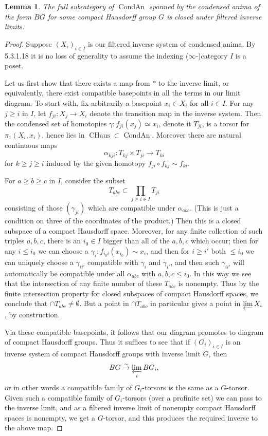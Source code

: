 \documentclass[12pt]{article}
\newtheorem{lemma}[theorem]{Lemma}
\theoremstyle{definition}
\newcommand{\on}{\operatorname}
\begin{document}
\begin{lemma}\label{nonabrlim}
The full subcategory of $\on{CondAn}$ spanned by the condensed anima of the form $BG$ for some compact Hausdorff group $G$ is closed under filtered inverse limits.
\end{lemma}
\begin{proof}
Suppose $(X_i)_{i\in I}$ is our filtered inverse system of condensed anima.  By \cite{htt} 5.3.1.18 it is no loss of generality to assume the indexing ($\infty$-)category $I$ is a poset.

Let us first show that there exists a map from $\ast$ to the inverse limit, or equivalently, there exist compatible basepoints in all the terms in our limit diagram.  To start with, fix arbitrarily a basepoint $x_i \in X_i$ for all $i\in I$.  For any $j\geq i$ in $I$, let $f_{ji}:X_j \to X_i$ denote the transition map in the inverse system.  Then the condensed set of homotopies $\gamma: f_{ji}(x_j)\simeq x_i$, denote it $T_{ji}$, is a torsor for $\pi_1(X_i,x_i)$, hence lies in $\on{CHaus}\subset\on{CondAn}$.  Moreover there are natural continuous maps
$$\alpha_{kji}: T_{kj} \times T_{ji} \to T_{ki}$$
for $k\geq j\geq i$ induced by the given homotopy $f_{ji}\circ f_{kj} \sim f_{ki}$.

For $a\geq b\geq c$ in $I$, consider the subset
$$T_{abc} \subset \prod_{j\geq i \in I} T_{ji}$$ consisting of those $(\gamma_{ji})$ which are compatible under $\alpha_{abc}$.  (This is just a condition on three of the coordinates of the product.)  Then this is a closed subspace of a compact Hausdorff space.  Moreover, for any finite collection of such triples $a,b,c$, there is an $i_0\in I$ bigger than all of the $a,b,c$ which occur; then for any $i\leq i_0$ we can choose a $\gamma_i: f_{i_0i}(x_{i_0})\sim x_i$, and then for $i\geq i'$ both $\leq i_0$ we can uniquely choose a $\gamma_{ii'}$ compatible with $\gamma_i$ and $\gamma_{i'}$, and then such $\gamma_{ii'}$ will automatically be compatible under all $\alpha_{abc}$ with $a,b,c\leq i_0$.  In this way we see that the intersection of any finite number of these $T_{abc}$ is nonempty. Thus by the finite intersection property for closed subspaces of compact Hausdorff spaces, we conclude that $\cap T_{abc}\neq \emptyset$.  But a point in $\cap T_{abc}$ in particular gives a point in $\varprojlim X_i$, by construction.

Via these compatible basepoints, it follows that our diagram promotes to diagram of compact Hausdorff groups.  Thus it suffices to see that if $(G_i)_{i\in I}$ is an inverse system of compact Hausdorff groups with inverse limit $G$, then
$$BG\overset{\sim}{\rightarrow} \varprojlim_i BG_i,$$
or in other words a compatible family of $G_i$-torsors is the same as a $G$-torsor.  Given such a compatible family of $G_i$-torsors (over a profinite set) we can pass to the inverse limit, and as a filtered inverse limit of nonempty compact Hausdorff spaces is nonempty, we get a $G$-torsor, and this produces the required inverse to the above map.\end{proof}
\end{document}
